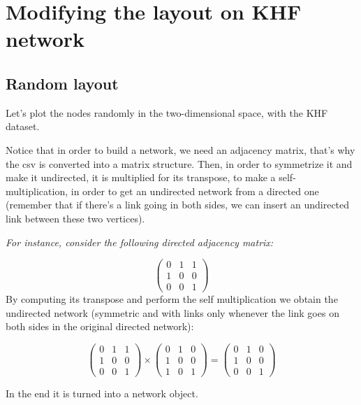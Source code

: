 \documentclass[
  notitlepage,
  onecolumn,
  openany]{book}
\begin{document}
\hypertarget{modifying-the-layout-on-khf-network}{%
\section{Modifying the layout on KHF network}\label{modifying-the-layout-on-khf-network}}

\hypertarget{random-layout}{%
\subsection{Random layout}\label{random-layout}}

Let's plot the nodes randomly in the two-dimensional space, with the KHF dataset.

Notice that in order to build a network, we need an adjacency matrix, that's why the csv is converted into a matrix structure. Then, in order to symmetrize it and make it undirected, it is multiplied for its transpose, to make a self-multiplication, in order to get an undirected network from a directed one (remember that if there's a link going in both sides, we can insert an undirected link between these two vertices).

\emph{For instance, consider the following directed adjacency matrix:}

\[
\left( \begin{array}{ccc}
0 & 1 & 1 \\
1 & 0 & 0 \\
0 & 0 & 1 \end{array} \right)
\]
By computing its transpose and perform the self multiplication we obtain the undirected network (symmetric and with links only whenever the link goes on both sides in the original directed network):

\[
\left( \begin{array}{ccc}
0 & 1 & 1 \\
1 & 0 & 0 \\
0 & 0 & 1 \end{array} \right) \times 
\left( \begin{array}{ccc}
0 & 1 & 0 \\
1 & 0 & 0 \\
1 & 0 & 1 \end{array} \right) = 
\left( \begin{array}{ccc}
0 & 1 & 0 \\
1 & 0 & 0 \\
0 & 0 & 1 \end{array} \right)
\]

In the end it is turned into a network object.
\end{document}
